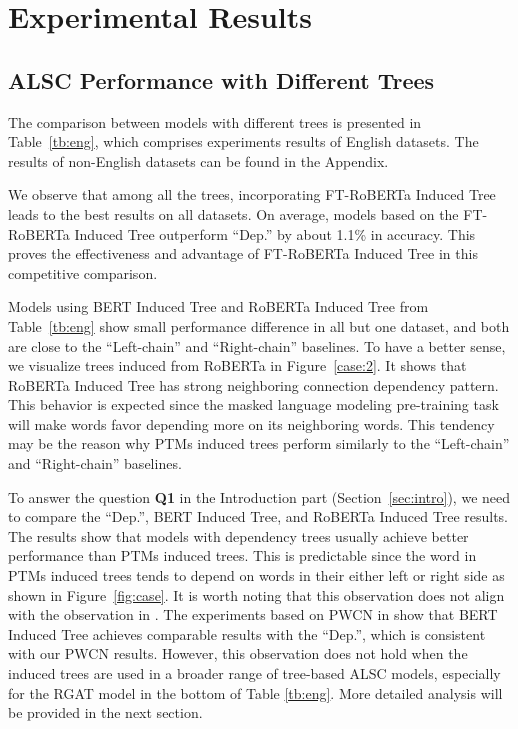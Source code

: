 \documentclass[11pt]{article}
\begin{document}
\section{Experimental Results}
\subsection{ALSC Performance with Different Trees}
\label{sec:pts}
The comparison between models with different trees is presented in Table~\ref{tb:eng}, which comprises experiments results of English datasets. The results of non-English datasets can be found in the Appendix.

We observe that among all the trees, incorporating FT-RoBERTa Induced Tree leads to the best results on all datasets. On average,  models based on the FT-RoBERTa Induced Tree outperform ``Dep.'' by about 1.1\%  in accuracy. This proves the effectiveness and advantage of FT-RoBERTa Induced Tree in this competitive comparison.

Models using BERT Induced Tree and RoBERTa Induced Tree from Table~\ref{tb:eng} show small performance difference in all but one dataset, and both are close to the ``Left-chain'' and ``Right-chain'' baselines. To have a better sense, we visualize trees induced from RoBERTa in Figure~\ref{case:2}. It shows that RoBERTa Induced Tree has strong neighboring connection dependency pattern. This behavior is expected since the masked language modeling pre-training task will make words favor depending more on its neighboring words. This tendency may be the reason why PTMs induced trees perform similarly to the ``Left-chain'' and ``Right-chain'' baselines.



To answer the question \textbf{Q1} in the Introduction part (Section~\ref{sec:intro}), we need to compare the ``Dep.'', BERT Induced Tree, and RoBERTa Induced Tree  results. The results show that models with dependency trees usually achieve better performance than PTMs induced trees. This is predictable since the word in PTMs induced trees tends to depend on words in their either left or right side as shown in Figure~\ref{fig:case}.
It is worth noting that this observation does not align with the observation in \citet{DBLP:conf/acl/WuCKL20}. The experiments based on PWCN in \citet{DBLP:conf/acl/WuCKL20} show that BERT Induced Tree achieves comparable results with the ``Dep.'', which is consistent with our PWCN results.  However, this observation does not hold when the induced trees are used in a broader range of tree-based ALSC models, especially for the RGAT model in the bottom of Table \ref{tb:eng}. More detailed analysis will be provided in the next section.
\end{document}
